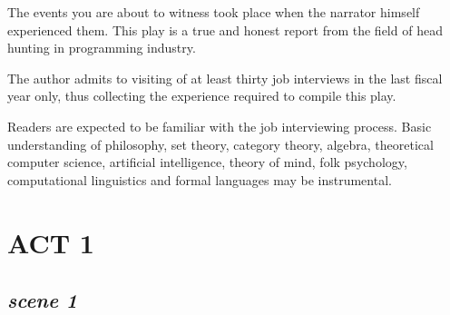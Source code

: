 \documentclass[11pt,a4paper,oneside]{memoir}
\begin{document}
\begin{description}[itemsep=1ex,leftmargin=0.20cm]

\item[] The events you are about to witness took place when the
  narrator himself experienced them. This play is a true and honest
  report from the field of head hunting in programming industry.

\item[] The author admits to visiting of at least thirty job
  interviews in the last fiscal year only, thus collecting the
  experience required to compile this play.

\item[] Readers are expected to be familiar with the job interviewing
  process. Basic understanding of philosophy, set theory, category
  theory, algebra, theoretical computer science, artificial
  intelligence, theory of mind, folk psychology, computational
  linguistics and formal languages may be instrumental.

\end{description}

\clearpage


\chapter*{ACT 1}

\section*{\hfill\textit{scene 1}}
\end{document}
